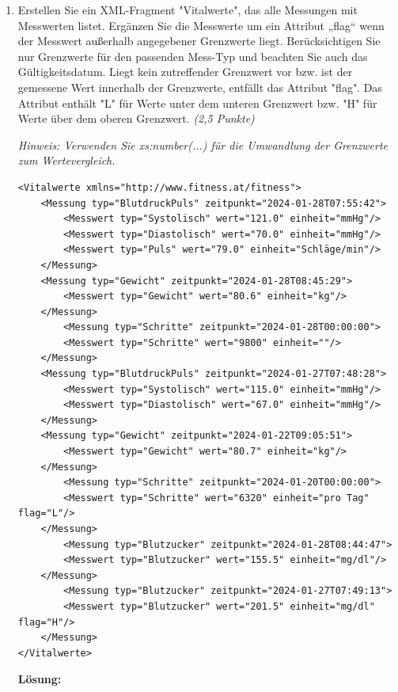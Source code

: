 \documentclass[a4paper,11pt]{report}
\begin{document}
\begin{enumerate}[1.]
    \item Erstellen Sie ein XML-Fragment "Vitalwerte", das alle Messungen mit Messwerten listet.
    Ergänzen Sie die Messwerte um ein Attribut „flag“ wenn der Messwert außerhalb angegebener Grenzwerte liegt. 
    Berücksichtigen Sie nur Grenzwerte für den passenden Mess-Typ und beachten Sie auch das Gültigkeitsdatum. 
    Liegt kein zutreffender Grenzwert vor bzw. ist der gemessene Wert innerhalb der Grenzwerte, entfällt das Attribut "flag".
    Das Attribut enthält "L" für Werte unter dem unteren Grenzwert bzw. "H" für Werte über dem oberen Grenzwert. \textit{(2,5 Punkte)}

    \textit{Hinweis: Verwenden Sie xs:number(...) für die Umwandlung der Grenzwerte zum Wertevergleich.}

    \begin{verbatim}
<Vitalwerte xmlns="http://www.fitness.at/fitness">
    <Messung typ="BlutdruckPuls" zeitpunkt="2024-01-28T07:55:42">
        <Messwert typ="Systolisch" wert="121.0" einheit="mmHg"/>
        <Messwert typ="Diastolisch" wert="70.0" einheit="mmHg"/>
        <Messwert typ="Puls" wert="79.0" einheit="Schläge/min"/>
    </Messung>
    <Messung typ="Gewicht" zeitpunkt="2024-01-28T08:45:29">
        <Messwert typ="Gewicht" wert="80.6" einheit="kg"/>
    </Messung>
        <Messung typ="Schritte" zeitpunkt="2024-01-28T00:00:00">
        <Messwert typ="Schritte" wert="9800" einheit=""/>
    </Messung>
    <Messung typ="BlutdruckPuls" zeitpunkt="2024-01-27T07:48:28">
        <Messwert typ="Systolisch" wert="115.0" einheit="mmHg"/>
        <Messwert typ="Diastolisch" wert="67.0" einheit="mmHg"/>
    </Messung>
    <Messung typ="Gewicht" zeitpunkt="2024-01-22T09:05:51">
        <Messwert typ="Gewicht" wert="80.7" einheit="kg"/>
    </Messung>
        <Messung typ="Schritte" zeitpunkt="2024-01-20T00:00:00">
        <Messwert typ="Schritte" wert="6320" einheit="pro Tag" flag="L"/>
    </Messung>
        <Messung typ="Blutzucker" zeitpunkt="2024-01-28T08:44:47">
        <Messwert typ="Blutzucker" wert="155.5" einheit="mg/dl"/>
    </Messung>
        <Messung typ="Blutzucker" zeitpunkt="2024-01-27T07:49:13">
        <Messwert typ="Blutzucker" wert="201.5" einheit="mg/dl" flag="H"/>
    </Messung>
</Vitalwerte>       
    \end{verbatim}
    \textbf{Lösung:}
    \inputminted[frame=lines, breaklines, linenos]{xquery}{assets/ue3_1_5.xq}
    \newpage

    \end{enumerate}
\end{document}
